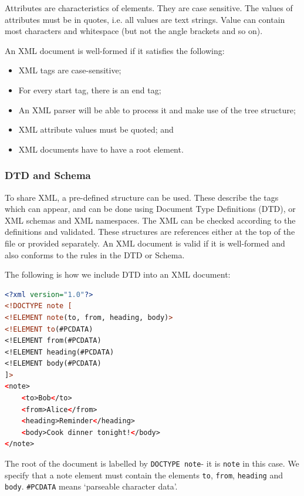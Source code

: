 \documentclass[a4paper, openany]{memoir}
\begin{document}
Attributes are characteristics of elements. They are case sensitive. The values of attributes must be in quotes, i.e. all values are text strings. Value can contain most characters and whitespace (but not the angle brackets and so on).

An XML document is well-formed if it satisfies the following:
\begin{itemize}
    \item XML tags are case-sensitive;
    \item For every start tag, there is an end tag;
    \item An XML parser will be able to process it and make use of the tree structure;
    \item XML attribute values must be quoted; and
    \item XML documents have to have a root element.
\end{itemize}

\subsubsection{DTD and Schema}
To share XML, a pre-defined structure can be used. These describe the tags which can appear, and can be done using Document Type Definitions (DTD), or XML schemas and XML namespaces. The XML can be checked according to the definitions and validated. These structures are references either at the top of the file or provided separately. An XML document is valid if it is well-formed and also conforms to the rules in the DTD or Schema.

The following is how we include DTD into an XML document:
\begin{lstlisting}[language=xml]
<?xml version="1.0"?>
<!DOCTYPE note [
<!ELEMENT note(to, from, heading, body)>
<!ELEMENT to(#PCDATA)
<!ELEMENT from(#PCDATA)
<!ELEMENT heading(#PCDATA)
<!ELEMENT body(#PCDATA)
]>
<note>
    <to>Bob</to>
    <from>Alice</from>
    <heading>Reminder</heading>
    <body>Cook dinner tonight!</body>
</note>
\end{lstlisting}
The root of the document is labelled by \texttt{DOCTYPE note}- it is \texttt{note} in this case. We specify that a note element must contain the elements \texttt{to}, \texttt{from}, \texttt{heading} and \texttt{body}. \texttt{\#PCDATA} means `parseable character data'.
\end{document}
